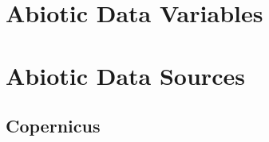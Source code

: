\documentclass[a4paper,10pt]{book}
\begin{document}
\tableofcontents
\newpage
\section{Abiotic Data Variables}

\section{Abiotic Data Sources}
\subsection{Copernicus}

\end{document}
